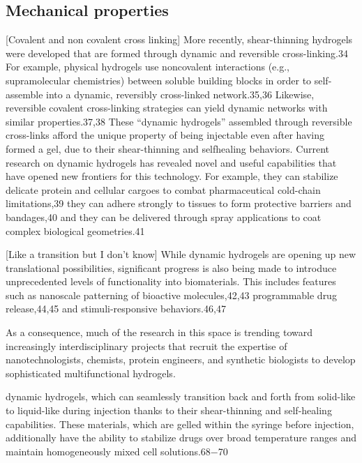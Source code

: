 \subsection{Mechanical properties}

[Covalent and non covalent cross linking]
More recently, shear-thinning hydrogels were developed that  are formed through dynamic and reversible cross-linking.34 
For example, physical hydrogels use noncovalent interactions (e.g., supramolecular chemistries) between soluble building blocks in order to self-assemble into a dynamic, reversibly cross-linked  network.35,36 
Likewise, reversible covalent cross-linking strategies can yield dynamic networks with similar properties.37,38 These “dynamic hydrogels” assembled through reversible cross-links afford the unique property of being injectable even after having formed a gel, due to their shear-thinning and selfhealing behaviors. 
Current research on dynamic hydrogels has revealed novel and useful capabilities that have opened new frontiers for this technology. 
For example, they can stabilize delicate protein and cellular cargoes to combat pharmaceutical  cold-chain limitations,39 they can adhere strongly to tissues to  form protective barriers and bandages,40 and they can be delivered through spray applications to coat complex biological  geometries.41\citep{correaTranslationalApplicationsHydrogels2021}

[Like a transition but I don't know]
While dynamic hydrogels are opening up new translational possibilities, significant progress is also being made to introduce unprecedented levels of functionality into biomaterials. 
This includes features such as nanoscale patterning of  bioactive molecules,42,43 programmable drug release,44,45 and  stimuli-responsive behaviors.46,47\citep{correaTranslationalApplicationsHydrogels2021} 

As a consequence, much of the research in this space is trending toward increasingly interdisciplinary projects that recruit the expertise of nanotechnologists, chemists, protein engineers, and synthetic biologists to develop sophisticated multifunctional hydrogels\citep{correaTranslationalApplicationsHydrogels2021}. 


dynamic hydrogels, which can seamlessly transition back and forth from solid-like to liquid-like during injection thanks to their shear-thinning and self-healing capabilities. 
These materials, which are gelled within the syringe before injection, additionally have the ability to stabilize drugs over broad temperature ranges and maintain homogeneously mixed  cell solutions.68−70\citep{correaTranslationalApplicationsHydrogels2021} 



